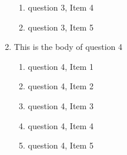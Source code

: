 \documentclass{article}
\begin{document}
\begin{enumerate}
\begin{enumerate}
    \item
    question 3, Item 4

    \item
    question 3, Item 5

  \end{enumerate}

\item
This is the body of question 4

  \begin{enumerate}

    \item
    question 4, Item 1

    \item
    question 4, Item 2

    \item
    question 4, Item 3

    \item
    question 4, Item 4

    \item
    question 4, Item 5

  \end{enumerate}

\end{enumerate} %
\end{document}
